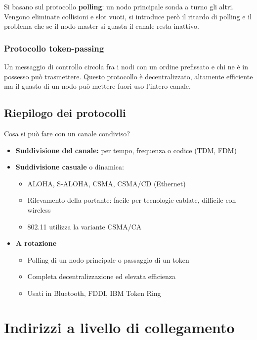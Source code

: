 \documentclass[
]{article}
\begin{document}
Si basano sul protocollo \textbf{polling}: un nodo principale sonda a
turno gli altri. Vengono eliminate collisioni e slot vuoti, si introduce
però il ritardo di polling e il problema che se il nodo master si guasta
il canale resta inattivo.

\hypertarget{header-n84}{%
\subsubsection{Protocollo token-passing}\label{header-n84}}

Un messaggio di controllo circola fra i nodi con un ordine prefissato e
chi ne è in possesso può trasmettere. Questo protocollo è
decentralizzato, altamente efficiente ma il guasto di un nodo può
mettere fuori uso l'intero canale.

\hypertarget{header-n86}{%
\subsection{Riepilogo dei protocolli}\label{header-n86}}

Cosa si può fare con un canale condiviso?

\begin{itemize}
\item
  \textbf{Suddivisione del canale:} per tempo, frequenza o codice (TDM,
  FDM)
\item
  \textbf{Suddivisione casuale} o dinamica:

  \begin{itemize}
  \item
    ALOHA, S-ALOHA, CSMA, CSMA/CD (Ethernet)
  \item
    Rilevamento della portante: facile per tecnologie cablate, difficile
    con wireless
  \item
    802.11 utilizza la variante CSMA/CA
  \end{itemize}
\item
  \textbf{A rotazione}

  \begin{itemize}
  \item
    Polling di un nodo principale o passaggio di un token
  \item
    Completa decentralizzazione ed elevata efficienza
  \item
    Usati in Bluetooth, FDDI, IBM Token Ring
  \end{itemize}
\end{itemize}

\hypertarget{header-n109}{%
\section{Indirizzi a livello di collegamento}\label{header-n109}}
\end{document}
